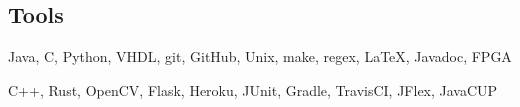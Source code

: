 \documentclass[18pt]{article}
\providecommand{\tightlist}{
    \setlength{\itemsep}{0pt}\setlength{\parskip}{0pt}
}
\begin{document}
    \subsection*{Tools}\label{languages}
    \begin{description}\tightlist
        \item[Proficient:] Java,
        C,
        Python,
        VHDL,
        git,
        GitHub,
        Unix,
        make,
        regex,
        \LaTeX,
        Javadoc,
        FPGA
        \item[Learning:] C++,
        Rust,
        OpenCV,
        Flask,
        Heroku,
        JUnit,
        Gradle,
        TravisCI,
        JFlex,
        JavaCUP
    \end{description}
\end{document}
